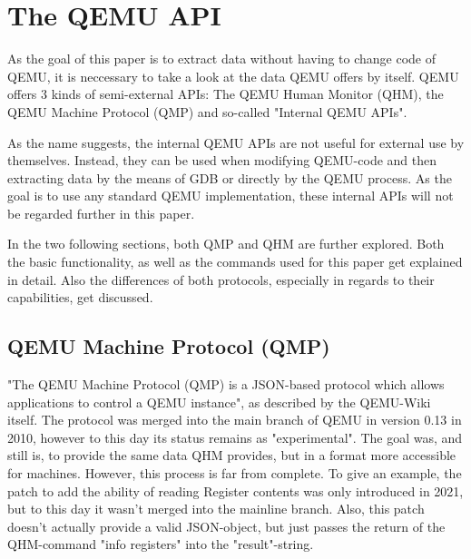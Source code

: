 
\chapter{The QEMU API}
As the goal of this paper is to extract data without having to change code of QEMU,
it is neccessary to take a look at the data QEMU offers by itself.
QEMU offers 3 kinds of semi-external APIs: The QEMU Human Monitor (QHM),
the QEMU Machine Protocol (QMP) and so-called "Internal QEMU APIs"\cite{internal}.

As the name suggests, the internal QEMU APIs are not useful for external use by themselves.
Instead, they can be used when modifying QEMU-code and then extracting data by the means of GDB or directly by the QEMU process.
As the goal is to use any standard QEMU implementation, these internal APIs will not be regarded further in this paper.

In the two following sections, both QMP and QHM are further explored. Both the basic functionality,
as well as the commands used for this paper get explained in detail.
Also the differences of both protocols, especially in regards to their capabilities,
get discussed.

\section{QEMU Machine Protocol (QMP)} \label{sec:QMP}
"The QEMU Machine Protocol (QMP) is a JSON-based protocol which allows applications to control a QEMU instance"\cite{qmp-description}, as described by the QEMU-Wiki itself.
The protocol was merged into the main branch of QEMU in version 0.13 in 2010, however to this day its status remains as "experimental"\cite{qmp-merge}.
The goal was, and still is, to provide the same data QHM provides, but in a format more accessible for machines.
However, this process is far from complete. To give an example, the patch to add the ability of reading Register contents was only introduced in 2021,
but to this day it wasn't merged into the mainline branch.
Also, this patch doesn't actually provide a valid JSON-object, but just passes the return of the QHM-command "info registers" into the "result"-string\cite{qmp-registers-patch}.

